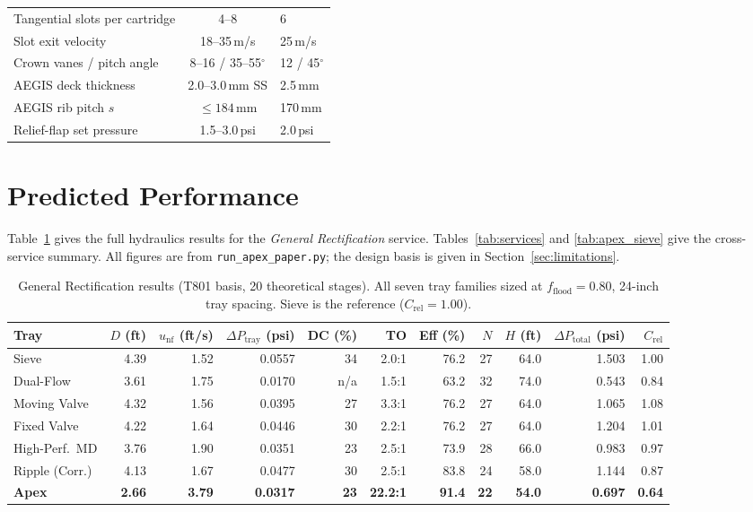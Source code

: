 \documentclass[11pt,letterpaper]{article}
\newcommand{\dpt}{\Delta P_{\mathrm{tray}}}
\newcommand{\dptot}{\Delta P_{\mathrm{total}}}
\newcommand{\unf}{u_{\mathrm{nf}}}
\begin{document}
\begin{table}[H]
\begin{tabular}{lcl}
Tangential slots per cartridge                        & 4--8            & 6\\
Slot exit velocity                                    & 18--35\,m/s     & 25\,m/s\\
Crown vanes / pitch angle                             & 8--16 / 35--55\ensuremath{^\circ}  & 12 / 45\ensuremath{^\circ}\\
AEGIS deck thickness                                  & 2.0--3.0\,mm SS & 2.5\,mm\\
AEGIS rib pitch $s$                                   & $\leq 184$\,mm  & 170\,mm\\
Relief-flap set pressure                              & 1.5--3.0\,psi   & 2.0\,psi\\
\bottomrule
\end{tabular}
\end{table}

\section{Predicted Performance}
\label{sec:performance}

Table~\ref{tab:genrect} gives the full hydraulics results for the
\textit{General Rectification} service.  Tables~\ref{tab:services} and
\ref{tab:apex_sieve} give the cross-service summary.
All figures are from \texttt{run\_apex\_paper.py}; the design basis is given
in Section~\ref{sec:limitations}.

\begin{table}[H]
\centering
\caption{General Rectification results (T801 basis, 20 theoretical stages).
  All seven tray families sized at $f_{\mathrm{flood}}=0.80$, 24-inch tray
  spacing.  Sieve is the reference ($C_{\mathrm{rel}} = 1.00$).}
\label{tab:genrect}
\small
\begin{tabular}{lrrrrrrrrrr}
\toprule
Tray & $D$ (ft) & $\unf$ (ft/s) & $\dpt$ (psi) & DC (\%)
  & TO & Eff (\%) & $N$ & $H$ (ft) & $\dptot$ (psi) & $C_{\mathrm{rel}}$\\
\midrule
Sieve          & 4.39 & 1.52 & 0.0557 & 34 & 2.0:1  & 76.2  & 27 & 64.0 & 1.503 & 1.00\\
Dual-Flow      & 3.61 & 1.75 & 0.0170 & n/a& 1.5:1  & 63.2  & 32 & 74.0 & 0.543 & 0.84\\
Moving Valve   & 4.32 & 1.56 & 0.0395 & 27 & 3.3:1  & 76.2  & 27 & 64.0 & 1.065 & 1.08\\
Fixed Valve    & 4.22 & 1.64 & 0.0446 & 30 & 2.2:1  & 76.2  & 27 & 64.0 & 1.204 & 1.01\\
High-Perf.\ MD & 3.76 & 1.90 & 0.0351 & 23 & 2.5:1  & 73.9  & 28 & 66.0 & 0.983 & 0.97\\
Ripple (Corr.) & 4.13 & 1.67 & 0.0477 & 30 & 2.5:1  & 83.8  & 24 & 58.0 & 1.144 & 0.87\\
\textbf{Apex}  & \textbf{2.66} & \textbf{3.79} & \textbf{0.0317} & \textbf{23}
  & \textbf{22.2:1} & \textbf{91.4} & \textbf{22} & \textbf{54.0}
  & \textbf{0.697} & \textbf{0.64}\\
\bottomrule
\end{tabular}
\end{table}
\end{document}
